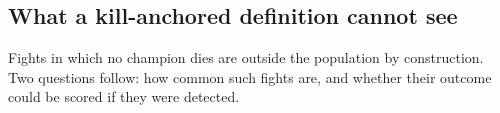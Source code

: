 \begin{table}[!t]
\end{table}

\subsection{What a kill-anchored definition cannot see}\label{sec:def-killless}

Fights in which no champion dies are outside the population by construction. Two questions follow:
how common such fights are, and whether their outcome could be scored if they were detected.

